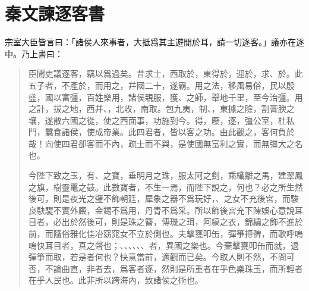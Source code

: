 \section[李斯諫逐客書\quad{\small 秦文}]{{\normalsize 秦文}\quad {}諫逐客書}
宗室大臣皆言曰：「諸侯人來事者，大抵爲其主遊閒於耳，請一切逐客。」議亦在逐中。乃上書曰：

\begin{quotation}
臣聞吏議逐客，竊以爲過矣。昔求士，西取於，東得於，迎於，求、於。此五子者，不產於，而用之，幷國二十，遂霸。用之法，移風易俗，民以殷盛，國以富彊，百姓樂用，諸侯親服，獲、之師，舉地千里，至今治彊。用之計，拔之地，西幷、，北收，南取。包九夷，制、，東據之險，割膏腴之壤，遂散六國之從，使之西面事，功施到今。得，廢，逐，彊公室，杜私門，蠶食諸侯，使成帝業。此四君者，皆以客之功。由此觀之，客何負於哉！向使四君卻客而不內，疏士而不與，是使國無富利之實，而無彊大之名也。

今陛下致之玉，有、之寶，垂明月之珠，服太阿之劍，乘纖離之馬，建翠鳳之旗，樹靈鼉之鼓。此數寶者，不生一焉，而陛下說之，何也？必之所生然後可，則是夜光之璧不飾朝廷，犀象之器不爲玩好，、之女不充後宮，而駿良駃騠不實外廄，金錫不爲用，丹青不爲采。所以飾後宮充下陳娛心意說耳目者，必出於然後可，則是珠之簪，傅璣之珥，阿縞之衣，錦繡之飾不進於前，而隨俗雅化佳冶窈窕女不立於側也。夫擊甕叩缶，彈箏搏髀，而歌呼嗚嗚快耳目者，真之聲也；、、、、、、者，異國之樂也。今棄擊甕叩缶而就，退彈箏而取，若是者何也？快意當前，適觀而已矣。今取人則不然，不問可否，不論曲直，非者去，爲客者逐，然則是所重者在乎色樂珠玉，而所輕者在乎人民也。此非所以跨海內，致諸侯之術也。


\end{quotation}
